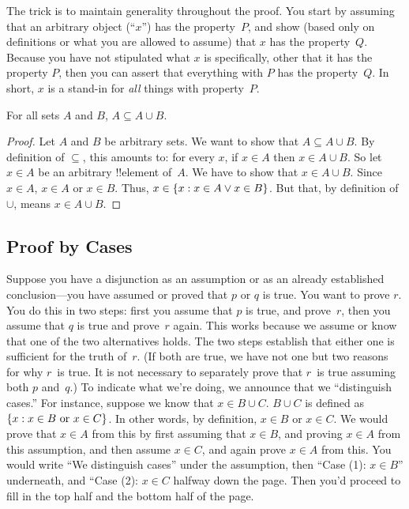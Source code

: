 \documentclass[../../../include/open-logic-section]{subfiles}
\begin{document}
The trick is to maintain generality throughout the proof. You start by
assuming that an arbitrary object (``$x$'') has the property~$P$, and
show (based only on definitions or what you are allowed to assume)
that $x$ has the property~$Q$. Because you have not stipulated what
$x$ is specifically, other that it has the property $P$, then you can
assert that everything with $P$ has the property~$Q$. In short, $x$ is a
stand-in for \emph{all} things with property~$P$.

\begin{prop}
  For all sets $A$ and $B$, $A \subseteq A \cup B$.
\end{prop}

\begin{proof}
  Let $A$ and $B$ be arbitrary sets.  We want to show that $A
  \subseteq A \cup B$. By definition of $\subseteq$, this amounts to:
  for every $x$, if $x \in A$ then $x \in A \cup B$. So let $x \in A$
  be an arbitrary !!{element} of~$A$. We have to show that $x \in A
  \cup B$. Since $x \in A$, $x \in A$ or $x \in B$. Thus, $x \in
  \{ x : x \in A \lor x \in B \}$. But that, by definition of $\cup
  $, means $x \in A \cup B$.
\end{proof}


\subsection{Proof by Cases}

Suppose you have a disjunction as an assumption or as an already
established conclusion---you have assumed or proved that $p$ or $q$ is
true.  You want to prove $r$.  You do this in two steps: first you
assume that $p$ is true, and prove~$r$, then you assume that $q$ is
true and prove~$r$ again.  This works because we assume or know that
one of the two alternatives holds. The two steps establish that either
one is sufficient for the truth of~$r$.  (If both are true, we have
not one but two reasons for why $r$~is true. It is not necessary to
separately prove that $r$~is true assuming both $p$ and~$q$.)  To
indicate what we're doing, we announce that we ``distinguish cases.''
For instance, suppose we know that $x \in B \cup C$.  $B \cup C$ is
defined as $\{ x : x \in B \text{ or } x \in C \}$. In other words,
by definition, $x \in B$ or $x \in C$. We would prove that $x \in A$
from this by first assuming that $x \in B$, and proving $x \in A$ from
this assumption, and then assume $x \in C$, and again prove $x \in A$
from this.  You would write ``We distinguish cases'' under the
assumption, then ``Case (1): $x \in B$'' underneath, and ``Case (2):
$x \in C$ halfway down the page. Then you'd proceed to fill in the top
half and the bottom half of the page.
\end{document}
